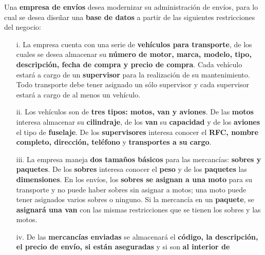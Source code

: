 \documentclass[12pt, letterpaper]{article}
\begin{document}
        Una \textbf{empresa de envíos} desea modernizar su administración
        de envíos, para lo cual se desea diseñar una \textbf{base de datos}
        a partir de las siguientes restricciones del negocio:
        
            \begin{itemize}
                \item[i.] La empresa cuenta con una serie de \textbf{vehículos para 
                        transporte}, de los cuales se desea almacenar su
                        \textbf{número de motor, marca, modelo, tipo, descripción, 
                        fecha de compra y precio de compra}. Cada vehículo estará
                        a cargo de un \textbf{supervisor} para la realización de 
                        su mantenimiento. Todo transporte debe tener asignado un
                        sólo supervisor y cada supervisor estará a cargo de al
                        menos un vehículo.
                \item[ii.] Los vehículos son de \textbf{tres tipos: motos, van y 
                        aviones}. De las \textbf{motos} interesa almacenar su
                        \textbf{cilindraje}, de los \textbf{van} su 
                        \textbf{capacidad} y de los \textbf{aviones} el tipo
                        de \textbf{fuselaje}. De los \textbf{supervisores} 
                        interesa conocer el \textbf{RFC, nombre completo, 
                        dirección, teléfono} y \textbf{transportes a su cargo}.
                \item[iii.] La empresa maneja \textbf{dos tamaños básicos} para las
                            mercancías: \textbf{sobres y paquetes}. De los 
                            \textbf{sobres} interesa conocer el \textbf{peso} y de
                            los \textbf{paquetes} las \textbf{dimensiones}. En los
                            envíos, los \textbf{sobres se asignan a una moto} para
                            su transporte y no puede haber sobres sin asignar a 
                            motos; una moto puede tener asignados varios sobres o
                            ninguno. Si la mercancía en un \textbf{paquete}, se 
                            \textbf{asignará una van} con las mismas restricciones
                            que se tienen los sobres y las motos.
                \item[iv.] De las \textbf{mercancías enviadas} se almacenará el 
                        \textbf{código, la descripción, el precio de envío, 
                        si están aseguradas} y si son \textbf{al interior de 
}
\end{itemize}
\end{document}
